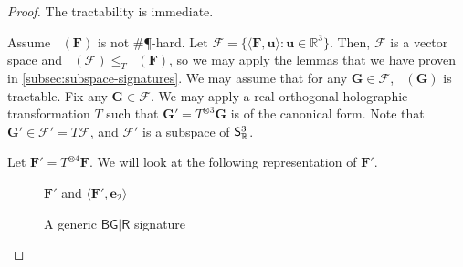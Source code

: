 \documentclass[11pt]{article}
\DeclareMathOperator{\holts}{Holant^*_3}
\newcommand{\db}{\mathsf{B}}
\newcommand{\dg}{\mathsf{G}}
\newcommand{\dr}{\mathsf{R}}
\newcommand{\sph}{\#\P-hard\xspace}
\newcommand{\teh}{^{\otimes 3}}
\begin{document}
\begin{proof}
  The tractability is immediate.

Assume $\holts(\mathbf{F})$ is not \sph.
Let $\mathscr{F} = \{\langle \mathbf{F}, \mathbf{u} \rangle : \mathbf{u} \in \mathbb{R}^3\}$.
Then, $\mathscr{F}$ is a vector space and $\holts(\mathscr{F}) \le_T \holts(\mathbf{F})$, so we may apply the lemmas that we have proven in \cref{subsec:subspace-signatures}.
We may assume that for any $\mathbf{G} \in \mathscr{F}$, $\holts(\mathbf{G})$ is tractable.
Fix any $\mathbf{G} \in \mathscr{F}$.
We may apply a real orthogonal holographic transformation $T$ such that $\mathbf{G}' = T\teh \mathbf{G}$ is of the canonical form.
Note that $\mathbf{G}' \in \mathscr{F}' = T \mathscr{F}$, and $\mathscr{F}'$ is a subspace of $\mathsf{S}^3_{\mathbb{R}}$.

Let $\mathbf{F}' = T^{\otimes 4} \mathbf{F}$.
We will look at the following representation of $\mathbf{F}'$.
\begin{figure}
\centering
\begin{minipage}[t]{0.5\linewidth}
\centering
\caption{$\mathbf{F}'$ and $\langle \mathbf{F}', \mathbf{e}_2 \rangle$} \label{fig:arity-4-signature}
\end{minipage}
\hfill
\begin{minipage}[t]{0.4\linewidth}
\centering
\caption{A generic $\db \dg | \dr$ signature} \label{fig:generic-bg-r}
\end{minipage}


\end{figure}
\end{proof}
\end{document}
